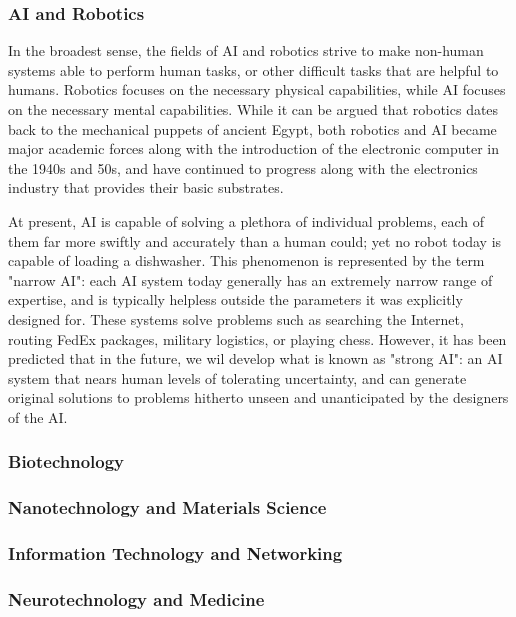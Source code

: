 \subsubsection{AI and Robotics}

In the broadest sense, the fields of AI and robotics strive to make non-human systems able to perform human tasks, or other difficult tasks that are helpful to humans. Robotics focuses on the necessary physical capabilities, while AI focuses on the necessary mental capabilities.  While it can be argued that robotics dates back to the mechanical puppets of ancient Egypt, both robotics and AI became major academic forces along with the introduction of the electronic computer in the 1940s and 50s, and have continued to progress along with the electronics  industry that provides their basic substrates.

At present, AI is capable of solving a plethora of individual problems, each of them far more swiftly and accurately than a human could; yet no robot today is capable of loading a dishwasher. This phenomenon is represented by the term "narrow AI": each AI system today generally has an extremely narrow range of expertise, and is typically helpless outside the parameters it was explicitly designed for. These systems solve problems such as searching the Internet, routing FedEx packages, military logistics, or playing chess. However, it has been predicted that in the future, we wil develop what is known as "strong AI": an AI system that nears human levels of tolerating uncertainty, and can generate original solutions to problems hitherto unseen and unanticipated by the designers of the AI.

\subsubsection{Biotechnology}



\subsubsection{Nanotechnology and Materials Science}



\subsubsection{Information Technology and Networking}



\subsubsection{Neurotechnology and Medicine}



